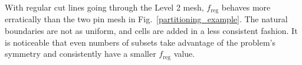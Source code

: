 \begin{table}[ht]
\centering
\caption{The tabulated results of the parametric study shown in Fig.~\ref{level2_metric_study} with no load balancing, 5 original load balancing iterations (LB), and 5 load-balancing-by-dimension (LBD) iterations for the Level 2 mesh.}
\label{level2_metric_study_table}
\end{table}

With regular cut lines going through the Level 2 mesh, $f_\text{reg}$ behaves more erratically than the two pin mesh in Fig.~\ref{partitioning_example}. The natural boundaries are not as uniform, and cells are added in a less consistent fashion. It is noticeable that even numbers of subsets take advantage of the problem's symmetry and consistently have a smaller $f_\text{reg}$ value.

